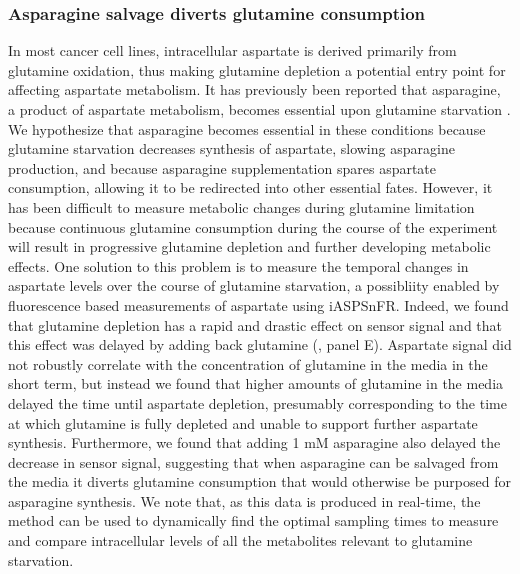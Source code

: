 \documentclass[9pt,lineno]{elife}
\begin{document}
\subsubsection{Asparagine salvage diverts glutamine consumption}
In most cancer cell lines, intracellular aspartate is derived primarily from glutamine oxidation, thus making glutamine depletion a potential entry point for affecting aspartate metabolism.
It has previously been reported that asparagine, a product of aspartate metabolism, becomes essential upon glutamine starvation \citep{Pavlova2018-nl}.
We hypothesize that asparagine becomes essential in these conditions because glutamine starvation decreases synthesis of aspartate, slowing asparagine production, and because asparagine supplementation spares aspartate consumption, allowing it to be redirected into other essential fates.
However, it has been difficult to measure metabolic changes during glutamine limitation because continuous glutamine consumption during the course of the experiment will result in progressive glutamine depletion and further developing metabolic effects.
One solution to this problem is to measure the temporal changes in aspartate levels over the course of glutamine starvation, a possibliity enabled by fluorescence based measurements of aspartate using iASPSnFR.
Indeed, we found that glutamine depletion has a rapid and drastic effect on sensor signal and that this effect was delayed by adding back glutamine (, panel E).
Aspartate signal did not robustly correlate with the concentration of glutamine in the media in the short term, but instead we found that higher amounts of glutamine in the media delayed the time until aspartate depletion, presumably corresponding to the time at which glutamine is fully depleted and unable to support further aspartate synthesis.
Furthermore, we found that adding 1 mM asparagine also delayed the decrease in sensor signal, suggesting that when asparagine can be salvaged from the media it diverts glutamine consumption that would otherwise be purposed for asparagine synthesis.
We note that, as this data is produced in real-time, the method can be used to dynamically find the optimal sampling times to measure and compare intracellular levels of all the metabolites relevant to glutamine starvation.
\end{document}
